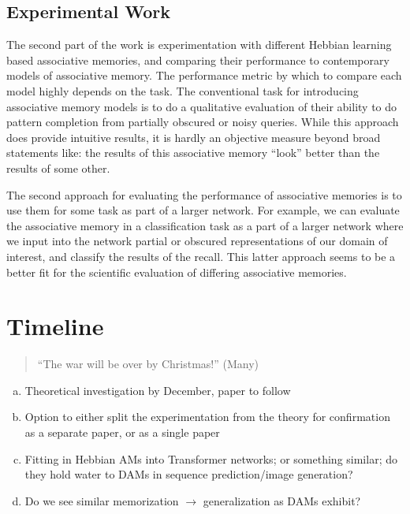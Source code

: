 \documentclass{article}
\theoremstyle{definition}
\begin{document}
\subsection{Experimental Work}\label{subsec:experimental}

The second part of the work is experimentation with different Hebbian
learning based associative memories, and comparing their performance to
contemporary models of associative memory. The performance metric by which
to compare each model highly depends on the task. The conventional task
for introducing associative memory models is to do a qualitative evaluation
of their ability to do pattern completion from partially obscured or noisy
queries. While this approach does provide intuitive results, it is hardly
an objective measure beyond broad statements like: the results of
this associative memory ``look'' better than the results of some other.

The second approach for evaluating the performance of associative memories
is to use them for some task as part of a larger network. For example, we can
evaluate the associative memory in a classification task as a part of
a larger network where we input into the network partial or obscured
representations of our domain of interest, and classify the results of the
recall. This latter approach seems to be a better fit for the scientific
evaluation of differing associative memories.

\section{Timeline}

\begin{quote}
  ``The war will be over by Christmas!'' (Many)
\end{quote}

\begin{enumerate}[(a)]
  \item Theoretical investigation by December, paper to follow
  \item Option to either split the experimentation from the theory
    for confirmation as a separate
    paper, or as a single paper
  \item Fitting in Hebbian AMs into Transformer networks; or
    something similar; do they hold
    water to DAMs in sequence prediction/image generation?
  \item Do we see similar memorization $\to$ generalization as DAMs exhibit?
\end{enumerate}

\printbibliography
\end{document}
